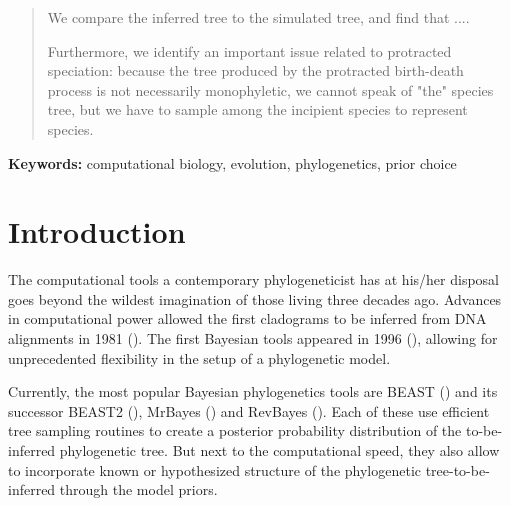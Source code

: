\documentclass{article}
\begin{document}
\begin{abstract}
  We compare the inferred tree to the simulated tree, and find that ....

  Furthermore, we identify an important issue related to protracted speciation:
  because the tree produced by the protracted birth-death process 
  is not necessarily monophyletic, we cannot speak of "the" species tree, but we
  have to sample among the incipient species to represent species. 



\end{abstract}

{\bf Keywords:} computational biology, evolution, phylogenetics, prior choice

\section{Introduction}

The computational tools a contemporary phylogeneticist has at his/her disposal
goes beyond the wildest imagination of those living three decades ago. 
Advances in computational power allowed the first cladograms to be inferred 
from DNA alignments in 1981 (\cite{felsenstein1981}). The first Bayesian tools 
appeared in 1996 (\cite{rannala1996}), allowing
for unprecedented flexibility in the setup of a phylogenetic model.

Currently, the most popular Bayesian phylogenetics tools are BEAST (\cite{beast})
and its successor BEAST2 (\cite{beast2}),  
MrBayes (\cite{mrbayes}) and RevBayes (\cite{revbayes}). 
Each of these use efficient tree sampling 
routines to create a posterior probability distribution of the to-be-inferred 
phylogenetic tree. But next to the computational speed, they also allow
to incorporate known or hypothesized structure of the phylogenetic 
tree-to-be-inferred through the model priors.
\end{document}
